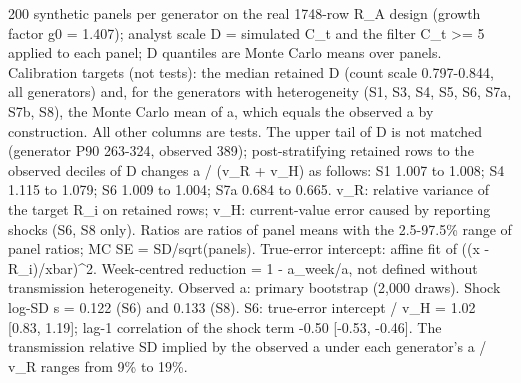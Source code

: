 \noindent\begin{minipage}{\linewidth}\footnotesize\raggedright
200 synthetic panels per generator on the real 1748-row R\_\allowbreak{}A design (growth factor g0 = 1.407); analyst scale D = simulated C\_\allowbreak{}t and the filter C\_\allowbreak{}t >= 5 applied to each panel; D quantiles are Monte Carlo means over panels. Calibration targets (not tests): the median retained D (count scale 0.797-0.844, all generators) and, for the generators with heterogeneity (S1, S3, S4, S5, S6, S7a, S7b, S8), the Monte Carlo mean of a, which equals the observed a by construction. All other columns are tests. The upper tail of D is not matched (generator P90 263-324, observed 389); post-stratifying retained rows to the observed deciles of D changes a / (v\_\allowbreak{}R + v\_\allowbreak{}H) as follows: S1 1.007 to 1.008; S4 1.115 to 1.079; S6 1.009 to 1.004; S7a 0.684 to 0.665. v\_\allowbreak{}R: relative variance of the target R\_\allowbreak{}i on retained rows; v\_\allowbreak{}H: current-value error caused by reporting shocks (S6, S8 only). Ratios are ratios of panel means with the 2.5-97.5\% range of panel ratios; MC SE = SD/sqrt(panels). True-error intercept: affine fit of ((x - R\_\allowbreak{}i)/xbar)\textasciicircum{}2. Week-centred reduction = 1 - a\_\allowbreak{}week/a, not defined without transmission heterogeneity. Observed a: primary bootstrap (2,000 draws). Shock log-SD s = 0.122 (S6) and 0.133 (S8). S6: true-error intercept / v\_\allowbreak{}H = 1.02 [0.83, 1.19]; lag-1 correlation of the shock term -0.50 [-0.53, -0.46]. The transmission relative SD implied by the observed a under each generator's a / v\_\allowbreak{}R ranges from 9\% to 19\%.
\end{minipage}\par
\endgroup
